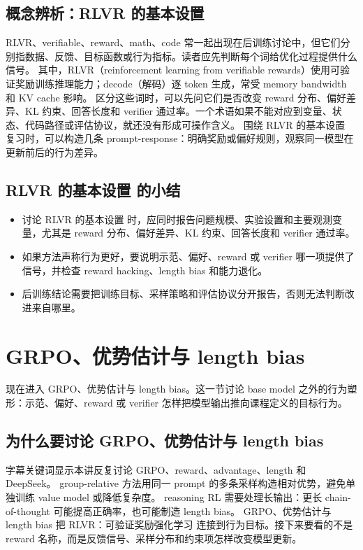 \documentclass[a4paper]{article}
\begin{document}
\subsection{概念辨析：RLVR 的基本设置}
RLVR、verifiable、reward、math、code 常一起出现在后训练讨论中，但它们分别指数据、反馈、目标函数或行为指标。读者应先判断每个词给优化过程提供什么信号。
其中，RLVR（reinforcement learning from verifiable rewards）使用可验证奖励训练推理能力；decode（解码）逐 token 生成，常受 memory bandwidth 和 KV cache 影响。
区分这些词时，可以先问它们是否改变 reward 分布、偏好差异、KL 约束、回答长度和 verifier 通过率。一个术语如果不能对应到变量、状态、代码路径或评估协议，就还没有形成可操作含义。
围绕 RLVR 的基本设置 复习时，可以构造几条 prompt-response：明确奖励或偏好规则，观察同一模型在更新前后的行为差异。
\subsection{RLVR 的基本设置 的小结}
\begin{itemize}
\item 讨论 RLVR 的基本设置 时，应同时报告问题规模、实验设置和主要观测变量，尤其是 reward 分布、偏好差异、KL 约束、回答长度和 verifier 通过率。
\item 如果方法声称行为更好，要说明示范、偏好、reward 或 verifier 哪一项提供了信号，并检查 reward hacking、length bias 和能力退化。
\item 后训练结论需要把训练目标、采样策略和评估协议分开报告，否则无法判断改进来自哪里。
\end{itemize}
\section{GRPO、优势估计与 length bias}
现在进入 GRPO、优势估计与 length bias。这一节讨论 base model 之外的行为塑形：示范、偏好、reward 或 verifier 怎样把模型输出推向课程定义的目标行为。
\subsection{为什么要讨论 GRPO、优势估计与 length bias}
字幕关键词显示本讲反复讨论 GRPO、reward、advantage、length 和 DeepSeek。
group-relative 方法用同一 prompt 的多条采样构造相对优势，避免单独训练 value model 或降低复杂度。
reasoning RL 需要处理长输出：更长 chain-of-thought 可能提高正确率，也可能制造 length bias。
GRPO、优势估计与 length bias 把 RLVR：可验证奖励强化学习 连接到行为目标。接下来要看的不是 reward 名称，而是反馈信号、采样分布和约束项怎样改变模型更新。
\end{document}

